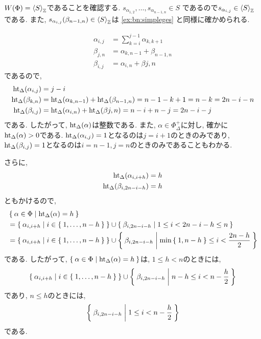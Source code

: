 $W(\Phi)=\Braket{S}_{\mathbb{Z}}$であることを確認する.
$s_{\alpha_{1,2}},\ldots,s_{\alpha_{n-1,n}}\in S$
であるので$s_{\alpha_{i,j}}\in\Braket{S}_{\mathbb{Z}}$である.
また, $s_{\alpha_{i,j}}(\beta_{n-1,n})\in\Braket{S}_{\mathbb{Z}}$は
\cref{ex:bn:simpleges}
と同様に確かめられる.

\begin{align*}
\alpha_{i,j}&=\sum_{k=i}^{j-1}\alpha_{k,k+1}\\
\beta_{j,n}&=\alpha_{k,n-1}+\beta_{n-1,n}\\
\beta_{i,j}&=\alpha_{i,n}+\beta{j,n}
\end{align*}
であるので, 
\begin{align*}
  \operatorname{ht}_\Delta(\alpha_{i,j})&=j-i\\
  \operatorname{ht}_\Delta(\beta_{k,n})&=\operatorname{ht}_\Delta(\alpha_{k,n-1})+\operatorname{ht}_\Delta(\beta_{n-1,n})=n-1-k+1=n-k=2n-i-n\\
\operatorname{ht}_\Delta(\beta_{i,j})&=\operatorname{ht}_\Delta(\alpha_{i,n})+\operatorname{ht}_\Delta(\beta{j,n})=n-i+n-j=2n-i-j
\end{align*}
である. 
したがって, $\operatorname{ht}_\Delta(\alpha)$は整数である.
また,
$\alpha\in\Phi_\Delta^+$に対し, 確かに$\operatorname{ht}_{\Delta}(\alpha)>0$である.
$\operatorname{ht}_\Delta(\alpha_{i,j})=1$となるのは$j=i+1$のときのみであり,
$\operatorname{ht}_\Delta(\beta_{i,j})=1$となるのは$i=n-1,j=n$のときのみであることもわかる.

さらに,
\begin{align*}
  \operatorname{ht}_\Delta(\alpha_{i,i+h})&=h\\
  \operatorname{ht}_\Delta(\beta_{i,2n-i-h})&=h
\end{align*}
ともかけるので,
\begin{align*}
  &\Set{\alpha\in\Phi|\operatorname{ht}_\Delta(\alpha)=h}\\
  &=\Set{\alpha_{i,i+h}|i\in\Set{1,\ldots,n-h}}
  \cup
  \Set{\beta_{i,2n-i-h}|1\leq i < 2n-i-h\leq n}\\
  &=\Set{\alpha_{i,i+h}|i\in\Set{1,\ldots,n-h}}
  \cup
  \Set{\beta_{i,2n-i-h}|\min\Set{1,n-h} \leq i < \frac{2n-h}{2}}
\end{align*}
である.  したがって,
$\Set{\alpha\in\Phi|\operatorname{ht}_\Delta(\alpha)=h}$は,
$1\leq h<n$のときには,
\begin{align*}
\Set{\alpha_{i,i+h}|i\in\Set{1,\ldots,n-h}}
  \cup
  \Set{\beta_{i,2n-i-h}|n-h \leq i < n-\frac{h}{2}}
\end{align*}
であり, $n\leq h $のときには,
\begin{align*}
\Set{\beta_{i,2n-i-h}|1 \leq i < n-\frac{h}{2}}
\end{align*}
である.

